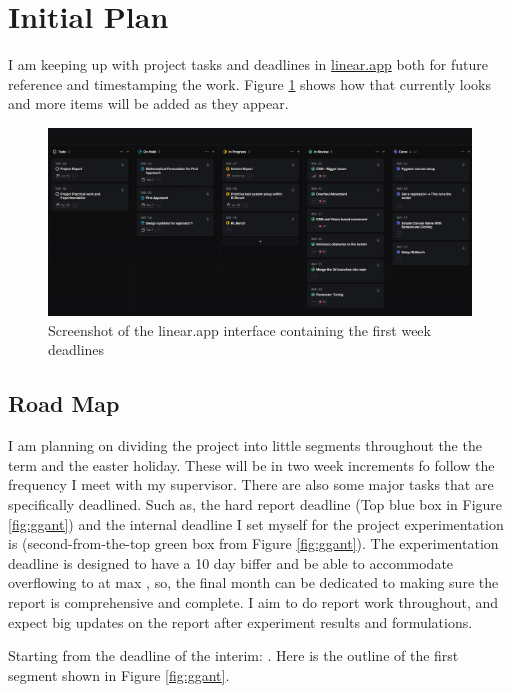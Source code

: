 \section{Initial Plan}
I am keeping up with project tasks and deadlines in \href{https://linear.app}{linear.app} both for future reference and timestamping the work. Figure \ref{fig:linear} shows how that currently looks and more items will be added as they appear.

\begin{figure}[h]
  \centering
  \includegraphics[width=\textwidth]{assets/initial-plan/initial-linear.png}
  \caption{Screenshot of the linear.app interface containing the first week deadlines}\label{fig:linear}
\end{figure}



\subsection{Road Map}
I am planning on dividing the project into little segments throughout the the term and the easter holiday. These will be in two week increments fo follow the frequency I meet with my supervisor. There are also some major tasks that are specifically deadlined. Such as, the hard report deadline  (Top blue box in Figure \ref{fig:ggant}) and the internal deadline I set myself for the project experimentation is  (second-from-the-top green box from Figure \ref{fig:ggant}). 
The experimentation deadline is designed to have a 10 day biffer and be able to accommodate overflowing to at max , so, the final month can be dedicated to making sure the report is comprehensive and complete. I aim to do report work throughout, and expect big updates on the report after experiment results and formulations.

Starting from the deadline of the interim: . Here is the outline of the first segment shown in Figure \ref{fig:ggant}.

